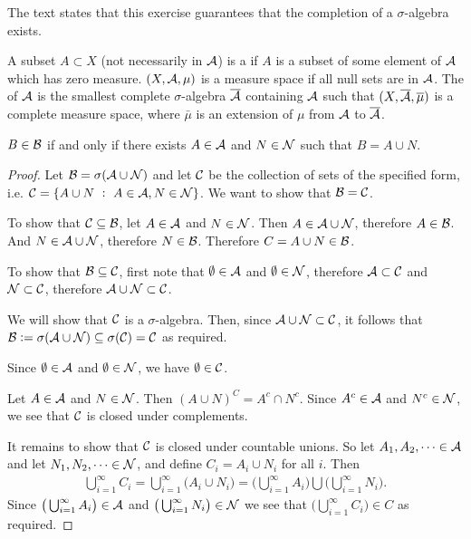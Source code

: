 \begin{remark*}
  The text states that this exercise guarantees that the completion of a $\sigma$-algebra exists.

  A subset $A \subset X$ (not necessarily in $\mathcal A$) is a  if $A$ is a subset of some element of
  $\mathcal A$ which has zero measure. $(X, \mathcal A, \mu)$ is a  measure space if all null sets are in
  $\mathcal A$. The  of $\mathcal A$ is the smallest complete $\sigma$-algebra $\overline{\mathcal A}$ containing
  $\mathcal A$ such that $(X, \overline{\mathcal A}, \overline \mu)$ is a complete measure space, where $\bar \mu$ is an extension
  of $\mu$ from $\mathcal A$ to $\overline{\mathcal A}$.
\end{remark*}

\begin{lemma*}\label{lemma-3-8-1}
  $B \in \mathcal B$ if and only if there exists $A \in \mathcal A$ and $N \in \mathcal N$ such that $B = A \cup N$.
\end{lemma*}

\begin{proof}
  Let $\mathcal B = \sigma(\mathcal A \cup \mathcal N)$ and let $\mathcal C$ be the collection of sets of the specified form,
  i.e. $\mathcal C = \{A \cup N ~:~ A \in \mathcal A, N \in \mathcal N\}$. We want to show that $\mathcal B = \mathcal C$.

  To show that $\mathcal C \subseteq \mathcal B$, let $A \in \mathcal A$ and $N \in \mathcal N$. Then $A \in \mathcal A \cup \mathcal N$,
  therefore $A \in \mathcal B$. And $N \in \mathcal A \cup \mathcal N$, therefore $N \in \mathcal B$.
  Therefore $C = A \cup N \in \mathcal B$.

  To show that $\mathcal B \subseteq \mathcal C$, first note that $\emptyset \in \mathcal A$ and $\emptyset \in \mathcal N$,
  therefore $\mathcal A \subset \mathcal C$ and $\mathcal N \subset \mathcal C$, therefore $\mathcal A \cup \mathcal N \subset \mathcal C$.

  We will show that $\mathcal C$ is a $\sigma$-algebra. Then, since $\mathcal A \cup \mathcal N \subset \mathcal C$, it follows
  that $\mathcal B := \sigma(\mathcal A \cup \mathcal N) \subseteq \sigma(\mathcal C) = \mathcal C$ as required.

  Since $\emptyset \in \mathcal A$ and $\emptyset \in \mathcal N$, we have $\emptyset \in \mathcal C$.

  Let $A \in \mathcal A$ and $N \in \mathcal N$. Then $(A \cup N)^C = A^c \cap N^c$. Since $A^c \in \mathcal A$
  and $N^c \in \mathcal N$, we see that $\mathcal C$ is closed under complements.

  It remains to show that $\mathcal C$ is closed under countable unions. So let $A_1, A_2, \dots \in \mathcal A$ and
  let $N_1, N_2, \dots \in \mathcal N$, and define $C_i = A_i \cup N_i$ for all $i$. Then
  \begin{align*}
    \bigcup_{i=1}^\infty C_i = \bigcup_{i=1}^\infty \big(A_i \cup N_i\big) = \big(\bigcup_{i=1}^\infty A_i\big) \bigcup \big(\bigcup_{i=1}^\infty N_i \big).
  \end{align*}
  Since $\big(\bigcup_{i=1}^\infty A_i\big) \in \mathcal A$ and $\big(\bigcup_{i=1}^\infty N_i\big) \in \mathcal N$ we see that $\big(\bigcup_{i=1}^\infty C_i\big) \in C$ as required.
\end{proof}

